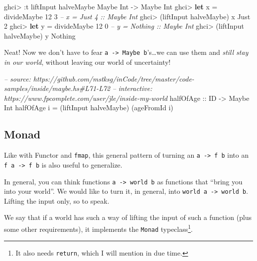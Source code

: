 \documentclass[]{article}
\newenvironment{Shaded}{}{}
\newcommand{\KeywordTok}[1]{\textcolor[rgb]{0.00,0.44,0.13}{\textbf{#1}}}
\newcommand{\DataTypeTok}[1]{\textcolor[rgb]{0.56,0.13,0.00}{#1}}
\newcommand{\DecValTok}[1]{\textcolor[rgb]{0.25,0.63,0.44}{#1}}
\newcommand{\CommentTok}[1]{\textcolor[rgb]{0.38,0.63,0.69}{\textit{#1}}}
\newcommand{\OtherTok}[1]{\textcolor[rgb]{0.00,0.44,0.13}{#1}}
\newcommand{\FunctionTok}[1]{\textcolor[rgb]{0.02,0.16,0.49}{#1}}
\newcommand{\NormalTok}[1]{#1}
\begin{document}
\begin{Shaded}
\begin{Highlighting}[]
\NormalTok{ghci}\FunctionTok{>} \FunctionTok{:}\NormalTok{t liftInput halveMaybe}
\DataTypeTok{Maybe} \DataTypeTok{Int} \OtherTok{->} \DataTypeTok{Maybe} \DataTypeTok{Int}
\NormalTok{ghci}\FunctionTok{>} \KeywordTok{let}\NormalTok{ x }\FunctionTok{=}\NormalTok{ divideMaybe }\DecValTok{12} \DecValTok{3}     \CommentTok{-- x = Just 4 :: Maybe Int}
\NormalTok{ghci}\FunctionTok{>}\NormalTok{ (liftInput halveMaybe) x}
\DataTypeTok{Just} \DecValTok{2}
\NormalTok{ghci}\FunctionTok{>} \KeywordTok{let}\NormalTok{ y }\FunctionTok{=}\NormalTok{ divideMaybe }\DecValTok{12} \DecValTok{0}     \CommentTok{-- y = Nothing :: Maybe Int}
\NormalTok{ghci}\FunctionTok{>}\NormalTok{ (liftInput halveMaybe) y}
\DataTypeTok{Nothing}
\end{Highlighting}
\end{Shaded}

Neat! Now we don't have to fear
\texttt{a\ -\textgreater{}\ Maybe\ b}'s\ldots{}we can use them and \emph{still
stay in our world}, without leaving our world of uncertainty!

\begin{Shaded}
\begin{Highlighting}[]
\CommentTok{-- source: https://github.com/mstksg/inCode/tree/master/code-samples/inside/maybe.hs#L71-L72}
\CommentTok{-- interactive: https://www.fpcomplete.com/user/jle/inside-my-world}
\OtherTok{halfOfAge ::} \DataTypeTok{ID} \OtherTok{->} \DataTypeTok{Maybe} \DataTypeTok{Int}
\NormalTok{halfOfAge i }\FunctionTok{=}\NormalTok{ (liftInput halveMaybe) (ageFromId i)}
\end{Highlighting}
\end{Shaded}

\subsection{Monad}\label{monad}

Like with Functor and \texttt{fmap}, this general pattern of turning an
\texttt{a\ -\textgreater{}\ f\ b} into an \texttt{f\ a\ -\textgreater{}\ f\ b}
is also useful to generalize.

In general, you can think functions \texttt{a\ -\textgreater{}\ world\ b} as
functions that ``bring you into your world''. We would like to turn it, in
general, into \texttt{world\ a\ -\textgreater{}\ world\ b}. Lifting the input
only, so to speak.

We say that if a world has such a way of lifting the input of such a function
(plus some other requirements), it implements the \texttt{Monad}
typeclass\footnote{It also needs \texttt{return}, which I will mention in due
  time.}.
\end{document}
